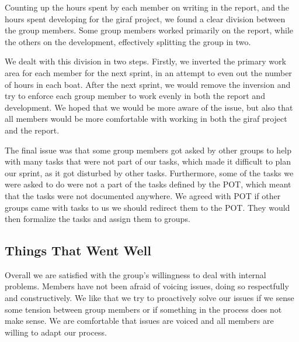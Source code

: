 Counting up the hours spent by each member on writing in the report, and the hours spent developing for the \gls{giraf} project, we found a clear division between the group members. Some group members worked primarily on the report, while the others on the development, effectively splitting the group in two.

We dealt with this division in two steps. Firstly, we inverted the primary work area for each member for the next sprint, in an attempt to even out the number of hours in each boat. After the next sprint, we would remove the inversion and try to enforce each group member to work evenly in both the report and development. We hoped that we would be more aware of the issue, but also that all members would be more comfortable with working in both the \gls{giraf} project and the report.

The final issue was that some group members got asked by other groups to help with many tasks that were not part of our tasks, which made it difficult to plan our sprint, as it got disturbed by other tasks. Furthermore, some of the tasks we were asked to do were not a part of the tasks defined by the \gls{POT}, which meant that the tasks were not documented anywhere. We agreed with \gls{POT} if other groups came with tasks to us we should redirect them to the \gls{POT}. They would then formalize the tasks and assign them to groups.

\subsection{Things That Went Well}

Overall we are satisfied with the group's willingness to deal with internal problems. Members have not been afraid of voicing issues, doing so respectfully and constructively. We like that we try to proactively solve our issues if we sense some tension between group members or if something in the process does not make sense. We are comfortable that issues are voiced and all members are willing to adapt our process.